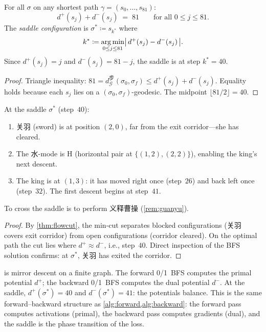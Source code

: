 \begin{proposition}\label{prop:duality-gap}
For all $\sigma$ on any shortest path
$\gamma = (s_0, \ldots, s_{81})$:
\begin{equation}\label{eq:duality-gap}
  d^+(s_j) + d^-(s_j) \;=\; 81
  \qquad \text{for all } 0 \leq j \leq 81.
\end{equation}
The \emph{saddle configuration} is
$\sigma^* \coloneqq s_{k^*}$ where
\[
  k^* \coloneqq \operatorname*{arg\,min}_{0 \leq j \leq 81}
  \bigl|\, d^+(s_j) - d^-(s_j) \,\bigr|.
\]
Since $d^+(s_j) = j$ and $d^-(s_j) = 81 - j$,
the saddle is at step $k^* = 40$.
\end{proposition}

\begin{proof}
Triangle inequality:
$81 = d_{\mathcal{G}}^{\text{步}}(\sigma_0, \sigma_f)
  \leq d^+(s_j) + d^-(s_j)$.
Equality holds because each $s_j$ lies on a
$(\sigma_0, \sigma_f)$-geodesic.
The midpoint $\lfloor 81/2 \rfloor = 40$.
\end{proof}

\begin{theorem}[Saddle $=$ phase transition]\label{thm:saddle}
At the saddle $\sigma^*$ (step~$40$):
\begin{enumerate}[label=(\roman*)]
  \item 关羽 (sword) is at position $(2, 0)$, far from
  the exit corridor---she has cleared.
  \item The 水-mode is H
  (horizontal pair at $\{(1,2), (2,2)\}$),
  enabling the king's next descent.
  \item The king is at $(1, 3)$: it has moved right once
  (step~$26$) and back left once (step~$32$).
  The first descent begins at step~$41$.
\end{enumerate}
To cross the saddle is to perform 义释曹操
(\cref{rem:guanyu}).
\end{theorem}

\begin{proof}
By \cref{thm:flowcut}, the min-cut separates
blocked configurations (关羽 covers exit corridor)
from open configurations (corridor cleared).
On the optimal path the cut lies where
$d^+ \approx d^-$, i.e., step~$40$.
Direct inspection of the BFS solution confirms:
at $\sigma^*$, 关羽 has exited the corridor.
\end{proof}

\begin{remark}\label{rem:mirror}
 is mirror descent on a finite graph.
The forward 0/1~BFS computes the primal potential $d^+$;
the backward 0/1~BFS computes the dual potential $d^-$.
At the saddle, $d^+(\sigma^*) = 40$ and
$d^-(\sigma^*) = 41$: the potentials balance.
This is the same forward--backward structure as
\cref{alg:forward,alg:backward}:
the forward pass computes activations (primal),
the backward pass computes gradients (dual),
and the saddle is the phase transition of the loss.
\end{remark}

